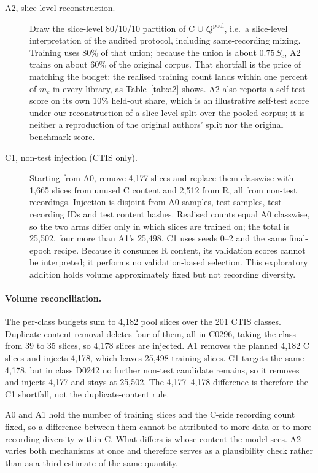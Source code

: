 \begin{description}
\item[A2, slice-level reconstruction.] Draw the slice-level 80/10/10 partition of C $\cup$
$Q^{\text{pool}}$, i.e.\ a slice-level interpretation of the audited protocol, including same-recording
mixing. Training uses 80\% of that union; because the union is about $0.75\,S_c$, A2 trains on about
60\% of the original corpus. That shortfall is the price of matching the budget: the realised
training count lands within one percent of $m_c$ in every library, as Table~\ref{tab:a2} shows. A2 also
reports a self-test score on its own 10\% held-out share, which is an illustrative self-test score
under our reconstruction of a slice-level split over the pooled corpus; it is neither a
reproduction of the original authors' split nor the original benchmark score.
\item[C1, non-test injection (CTIS only).] Starting from A0, remove 4{,}177 slices and
replace them classwise with 1{,}665 slices from unused C content and 2{,}512 from R, all from
non-test recordings. Injection is disjoint from A0 samples, test samples, test recording IDs
and test content hashes. Realised counts equal A0 classwise, so the two arms
differ only in which slices are trained on; the total is 25{,}502, four more than A1's
25{,}498.
C1 uses seeds 0--2 and the same final-epoch recipe. Because it consumes R content, its
validation scores cannot be interpreted; it performs no validation-based selection.
This exploratory addition holds volume approximately fixed but not recording diversity.
\end{description}

\paragraph{Volume reconciliation.} The per-class budgets sum to 4{,}182 pool slices over the
201 CTIS classes. Duplicate-content removal deletes four of them, all in C0296, taking the class
from 39 to 35 slices, so 4{,}178 slices are injected. A1 removes the planned 4{,}182 C slices and injects
4{,}178, which leaves 25{,}498 training slices. C1 targets the same 4{,}178, but in class D0242
no further non-test candidate remains, so it removes and injects 4{,}177 and stays at
25{,}502. The 4{,}177--4{,}178 difference is therefore the C1 shortfall, not the
duplicate-content rule.

A0 and A1 hold the number of training slices and the C-side recording count fixed, so a
difference between them cannot be attributed to more data or to more recording diversity within
C. What differs is whose content the model sees. A2 varies both mechanisms at once and therefore
serves as a plausibility check rather than as a third estimate of the same quantity.

